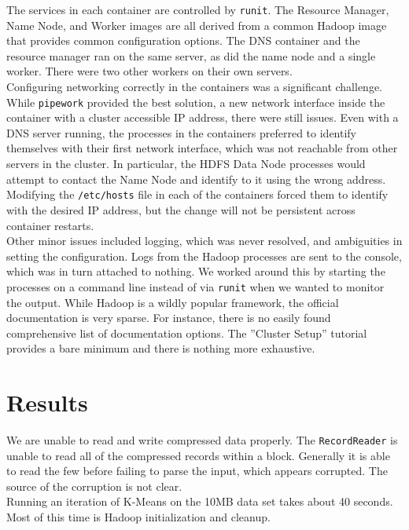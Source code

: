 \documentclass[paper=letter, fontsize=11pt]{scrartcl}
\numberwithin{equation}{section}		%
\numberwithin{figure}{section}			%
\numberwithin{table}{section}				%
\begin{document}
The services in each container are controlled by \texttt{runit}.  The Resource Manager, Name Node, and Worker images are all derived from a common Hadoop image that provides common configuration options.  The DNS container and the resource manager ran on the same server, as did the name node and a single worker.  There were two other workers on their own servers. \\

Configuring networking correctly in the containers was a significant challenge.
While \texttt{pipework} provided the best solution, a new network interface inside the container with a cluster accessible IP address, there were still issues.
Even with a DNS server running, the processes in the containers preferred to identify themselves with their first network interface, which was not reachable from other servers in the cluster.
In particular, the HDFS Data Node processes would attempt to contact the Name Node and identify to it using the wrong address.
Modifying the \texttt{/etc/hosts} file in each of the containers forced them to identify with the desired IP address, but the change will not be persistent across container restarts. \\

Other minor issues included logging, which was never resolved, and ambiguities in setting the configuration. Logs from the Hadoop processes are sent to the console, which was in turn attached to nothing.  We worked around this by starting the processes on a command line instead of via \texttt{runit} when we wanted to monitor the output.  While Hadoop is a wildly popular framework, the official documentation is very sparse.  For instance, there is no easily found comprehensive list of documentation options.  The ''Cluster Setup'' tutorial provides a bare minimum and there is nothing more exhaustive.


\section{Results}

We are unable to read and write compressed data properly.
The \texttt{RecordReader} is unable to read all of the compressed records within a block.
Generally it is able to read the few before failing to parse the input, which appears corrupted.
The source of the corruption is not clear. \\

Running an iteration of K-Means on the 10MB data set takes about 40 seconds.  Most of this time is Hadoop initialization and cleanup.
\end{document}
